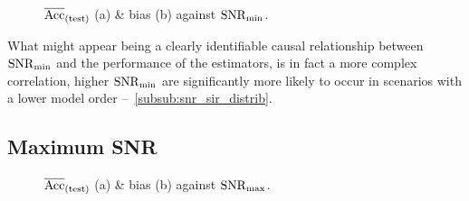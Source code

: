 \begin{figure}[H]
    \centering
    \caption{\( \overline{\text{Acc}}_{(\text{test})} \) (a) \& bias (b) against \( \mathrm{SNR}_{\min} \).}%
    \label{fig:snr_min_all_acc_bias}
\end{figure}

What might appear being a clearly identifiable causal relationship between \( \mathrm{SNR}_{\min} \) and the performance of the estimators,
is in fact a more complex correlation, higher \( \mathrm{SNR}_{\min} \) are significantly more likely to occur in scenarios with a lower
model order --~\autoref{subsub:snr_sir_distrib}.


\subsection{Maximum SNR}
\label{subsec:max_snr}

\begin{figure}[H]
    \centering
    \caption{\( \overline{\text{Acc}}_{(\text{test})} \) (a) \& bias (b) against \( \mathrm{SNR}_{\max} \).}%
    \label{fig:snr_max_all_acc_bias}
\end{figure}

